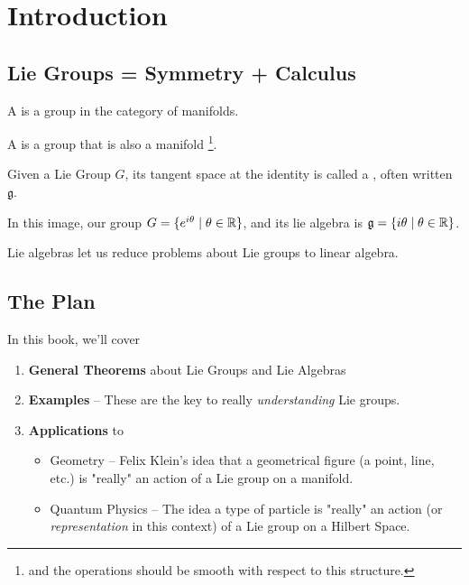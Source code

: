 \documentclass[../main.tex]{subfiles}
\begin{document}
\chapter{Introduction}%
\label{ch:introduction}



\section{Lie Groups = Symmetry + Calculus}
  
\begin{defn}
  A  is a group in the category of manifolds.
\end{defn}

\begin{defn}
  A  is a group that is also a manifold%
  \footnote{and the operations should be smooth with respect to this structure.}.
\end{defn}

Given a Lie Group $G$, its tangent space at the identity is called a 
, often written $\mathfrak{g}$.


In this image, our group $G = \{ e^{i \theta} \mid \theta \in \mathbb{R} \}$,
and its lie algebra is $\mathfrak{g} = \{ i \theta \mid \theta \in \mathbb{R} \}$.

Lie algebras let us reduce problems about Lie groups to linear algebra.

\section{The Plan}

In this book, we'll cover

\begin{enumerate}
  \item \textbf{General Theorems} about Lie Groups and Lie Algebras 
  \item \textbf{Examples} -- These are the key to really \emph{understanding} Lie groups.
  \item \textbf{Applications} to 
    \begin{itemize}
      \item Geometry -- Felix Klein's idea 
        that a geometrical figure (a point, line, etc.) is "really" an action of a Lie group on a manifold.
      \item Quantum Physics -- The idea  a type of particle
        is "really" an action (or \emph{representation} in this context) of a Lie group on a Hilbert Space.
    \end{itemize}
\end{enumerate}
\end{document}
